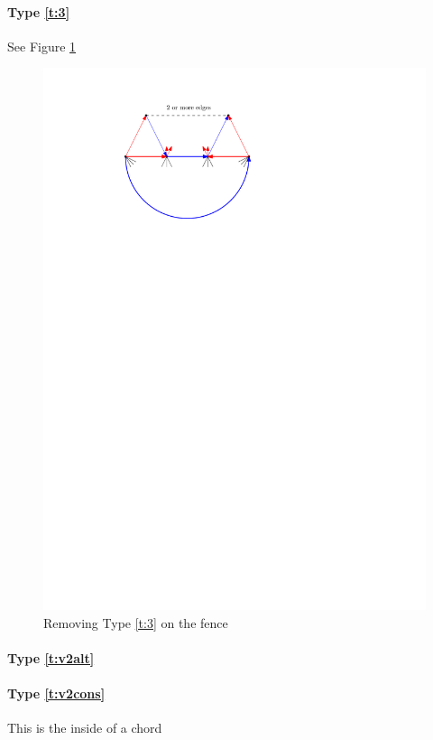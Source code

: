   \paragraph{Type \ref{t:3}}
  See Figure \ref{fig:4c:fence_d}


  \begin{figure}[h]
    \centering
    \includegraphics[scale=1]{4cycles/img/fence_d}
    \caption{Removing Type \ref{t:3} on the fence}
    \label{fig:4c:fence_d}
  \end{figure}

  \paragraph{Type \ref{t:v2alt}}


  \paragraph{Type \ref{t:v2cons}}
    This is the inside of a chord

